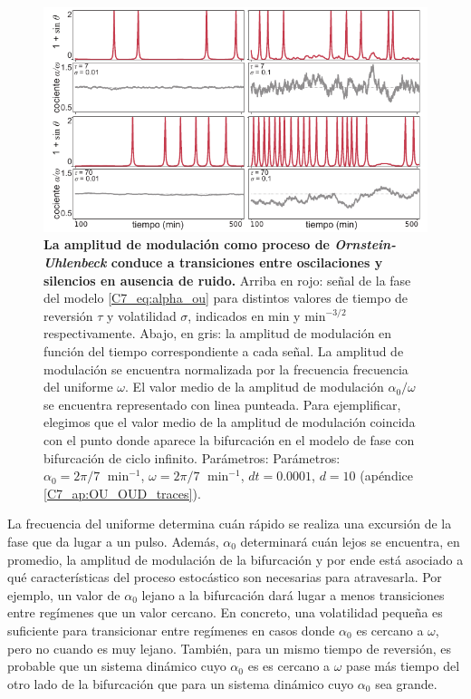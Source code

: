 \documentclass[./main.tex]{subfiles}
\begin{document}
\begin{figure}
    \centering
    \includegraphics[width=1\columnwidth]{figures/chapter7/C7_OU_ex_traces.pdf} 
    \caption{\textbf{La amplitud de modulación como proceso de \textit{Ornstein-Uhlenbeck} conduce a transiciones entre oscilaciones y silencios en ausencia de ruido.} Arriba en rojo: señal de la fase del modelo \ref{C7_eq:alpha_ou} para distintos valores de tiempo de reversión $\tau$ y volatilidad $\sigma$, indicados en min y $\text{min}^{-3/2}$ respectivamente. Abajo, en gris: la amplitud de modulación en función del tiempo correspondiente a cada señal. La amplitud de modulación se encuentra normalizada por la frecuencia frecuencia del uniforme $\omega$. El valor medio de la amplitud de modulación $\alpha_0/\omega$ se encuentra representado con linea punteada. Para ejemplificar, elegimos que el valor medio de la amplitud de modulación coincida con el punto donde aparece la bifurcación en el modelo de fase con bifurcación de ciclo infinito. Parámetros:  Parámetros: $\alpha_0 = 2\pi/7 \;\text{ min}^{-1}$, $\omega = 2\pi/7 \;\text{ min}^{-1}$, $dt = 0.0001$, $d=10$ (apéndice \ref{C7_ap:OU_OUD_traces}).}
    \label{C7_fig:OU_TS}
\end{figure} 


La frecuencia del uniforme determina cuán rápido se realiza una excursión de la fase que da lugar a un pulso. Además, $\alpha_0$ determinará cuán lejos se encuentra, en promedio, la amplitud de modulación de la bifurcación y por ende está asociado a qué características del proceso estocástico son necesarias para atravesarla. Por ejemplo, un valor de $\alpha_0$ lejano a la bifurcación dará lugar a menos transiciones entre regímenes que un valor cercano. En concreto, una volatilidad pequeña es suficiente para transicionar entre regímenes en casos donde $\alpha_0$ es cercano a $\omega$, pero no cuando es muy lejano. También, para un mismo tiempo de reversión, es probable que un sistema dinámico cuyo $\alpha_0$ es es cercano a $\omega$ pase más tiempo del otro lado de la bifurcación que para un sistema dinámico cuyo $\alpha_0$ sea grande.
\end{document}

